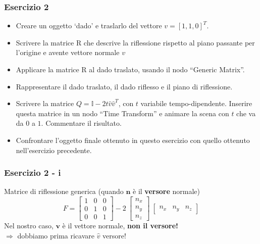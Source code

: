 \documentclass{beamer}
\begin{document}
\begin{frame}
\frametitle {Esercizio 2}
\begin{itemize}
    \item Creare un oggetto `dado' e traslarlo del vettore $v = [1, 1, 0]^T$.
    \item Scrivere la matrice R che descrive la riflessione rispetto al piano passante per l'origine e avente vettore normale $v$
    \item Applicare la matrice R al dado traslato, usando il nodo
        ``Generic Matrix''.
    \item Rappresentare il dado traslato, il dado riflesso e il piano di riflessione.
    \item Scrivere la matrice $Q = \mathbb{I} - 2t\hat{v}\hat{v}^T$, con $t$ variabile tempo-dipendente. Inserire questa matrice in un nodo
        ``Time Transform'' e animare la scena con $t$ che va da $0$ a $1$. Commentare il risultato.
    \item Confrontare l'oggetto finale ottenuto in questo esercizio con quello ottenuto nell'esercizio precedente.
\end{itemize}
\end{frame}
\begin{frame}
\frametitle{ Esercizio 2 - i}
    Matrice di riflessione generica (quando $\mathbf{n}$ \`e il \textbf{versore} normale)
\begin{equation}
F = \begin{bmatrix}
      1 & 0 & 0\\
      0 & 1 & 0\\
      0 & 0 & 1
    \end{bmatrix}
    -2~\begin{bmatrix}
    n_x \\
    n_y \\
    n_z
    \end{bmatrix} 
    ~\begin{bmatrix}
    n_x & n_y & n_z
    \end{bmatrix}
\end{equation}
    Nel nostro caso, $\mathbf{v}$ \`e il vettore normale, \textbf{non il versore!} \\
    $\Rightarrow$ dobbiamo prima ricavare $\hat{v}$ versore!
\end{frame}
\end{document}
